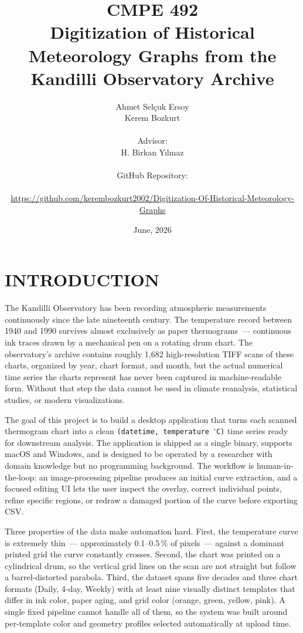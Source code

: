 \documentclass[a4paper,12pt]{report}
\begin{document}
\title{CMPE 492 \\ Digitization of Historical Meteorology Graphs from the Kandilli Observatory Archive}
\author{
Ahmet Sel\c{c}uk Ersoy \\
Kerem Bozkurt \\ \\
Advisor: \\
H. Birkan Y\i{}lmaz \\ \\
GitHub Repository: \\
\parbox{0.9\textwidth}{\centering\small\url{https://github.com/kerembozkurt2002/Digitization-Of-Historical-Meteorology-Graphs}}
}
\date{June, 2026}
\maketitle{}
\tableofcontents

\chapter{INTRODUCTION}

The Kandilli Observatory has been recording atmospheric measurements continuously since the late nineteenth century. The temperature record between 1940 and 1990 survives almost exclusively as paper thermograms~--- continuous ink traces drawn by a mechanical pen on a rotating drum chart. The observatory's archive contains roughly 1,682 high-resolution TIFF scans of these charts, organized by year, chart format, and month, but the actual numerical time series the charts represent has never been captured in machine-readable form. Without that step the data cannot be used in climate reanalysis, statistical studies, or modern visualizations.

The goal of this project is to build a desktop application that turns each scanned thermogram chart into a clean \texttt{(datetime, temperature\,$^\circ$C)} time series ready for downstream analysis. The application is shipped as a single binary, supports macOS and Windows, and is designed to be operated by a researcher with domain knowledge but no programming background. The workflow is human-in-the-loop: an image-processing pipeline produces an initial curve extraction, and a focused editing UI lets the user inspect the overlay, correct individual points, refine specific regions, or redraw a damaged portion of the curve before exporting CSV.

Three properties of the data make automation hard. First, the temperature curve is extremely thin~--- approximately 0.1--0.5\,\% of pixels~--- against a dominant printed grid the curve constantly crosses. Second, the chart was printed on a cylindrical drum, so the vertical grid lines on the scan are not straight but follow a barrel-distorted parabola. Third, the dataset spans five decades and three chart formats (Daily, 4-day, Weekly) with at least nine visually distinct templates that differ in ink color, paper aging, and grid color (orange, green, yellow, pink). A single fixed pipeline cannot handle all of them, so the system was built around per-template color and geometry profiles selected automatically at upload time.
\end{document}
